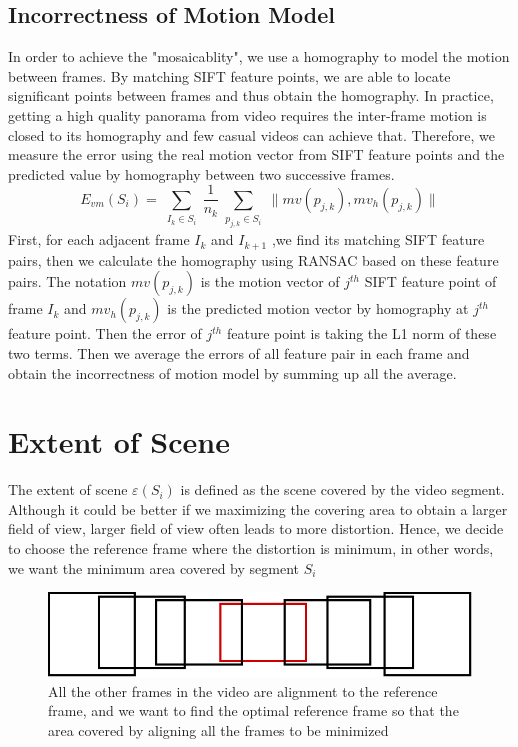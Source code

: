 \documentclass[12pt]{article}
\begin{document}
\subsection{Incorrectness of Motion Model}
In order to achieve the "mosaicablity", we use a homography to model the motion between frames. By matching SIFT feature points, we are able to locate significant points between frames and thus obtain the homography. In practice, getting a high quality panorama from video requires the inter-frame motion is closed to its homography and few casual videos can achieve that. Therefore, we measure the error using the real motion vector from SIFT feature points and the predicted value by homography between two successive frames.
\begin{equation}
\mathit{E_{vm}(S_i)} = \sum_{\substack{\mathit{I_k\in S_i}}} \frac{1}{\mathit{n_k}} \sum_{\substack{\mathit{p_{j,k}}\in \mathit{S_i}}} \lVert \mathit{mv(p_{j,k})}, \mathit{mv_h(p_{j,k})} \rVert
\end{equation}
First, for each adjacent frame $\mathit{I_k}$ and $\mathit{I_{k + 1}}$ ,we find its matching SIFT feature pairs, then we calculate the homography using RANSAC based on these feature pairs. The notation $\mathit{mv(p_{j,k})}$ is the motion vector of $\mathit{j^{th}}$ SIFT feature point of frame $\mathit{I_k}$ and $\mathit{mv_h(p_{j,k})}$ is the predicted motion vector by homography at $\mathit{j^{th}}$ feature point. Then the error of $\mathit{j^{th}}$ feature point is taking the L1 norm of these two terms. Then we average the errors of all feature pair in each frame and obtain the incorrectness of motion model by summing up all the average. 
 
 \section{Extent of Scene}
 	The extent of scene $\varepsilon(\mathit{S_i})$ is defined as the scene covered by the video segment. Although it could be better if we maximizing the covering area to obtain a larger field of view, larger field of view often leads to more distortion. Hence, we decide to choose the reference frame where the distortion is minimum, in other words, we want the minimum area covered by segment $\mathit{S_i}$
	
\begin{figure}[h]
	\centering
	\includegraphics[width=15cm]{reference}
	\caption{All the other frames in the video are alignment to the reference frame, and we want to find the optimal reference frame so that the area covered by aligning all the frames to be minimized}
\end{figure}
\end{document}
